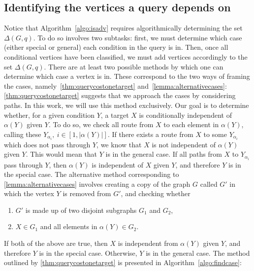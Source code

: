 \subsection{Identifying the vertices a query depends on}
\null \quad \quad Notice that Algorithm~\ref{algo:isadv} requires algorithmically determining the set $\Delta(G,q)$. To do so involves two subtasks: first, we must determine which case (either special or general) each condition in the query is in. Then, once all conditional vertices have been classified, we must add vertices accordingly to the set $\Delta(G,q)$. \newline
\null \quad \quad There are at least two possible methods by which one can determine which case a vertex is in. These correspond to the two ways of framing the cases, namely~\cref{thm:querycostonetarget} and~\cref{lemma:alternativecases}: \newline 
\null \quad \quad \cref{thm:querycostonetarget} suggests that we approach the cases by considering paths. In this work, we will use this method exclusively. Our goal is to determine whether, for a given condition $Y$, a target $X$ is conditionally independent of $\alpha(Y)$ given $Y$. To do so, we check all route from $X$ to each element in $\alpha(Y)$, calling these $Y_{\alpha_{i}},\  i \in [1,|\alpha(Y)|]$. If there exists a route from $X$ to some $Y_{\alpha_{i}}$ which does not pass through $Y$, we know that $X$ is not independent of $\alpha(Y)$ given $Y$. This would mean that $Y$ is in the general case.  If all paths from $X$ to $Y_{\alpha_{i}}$ pass through $Y$, then $\alpha(Y)$ is independent of $X$ given $Y$, and therefore $Y$ is in the special case. \newline
\null \quad \quad The alternative method corresponding to \cref{lemma:alternativecases} involves creating a copy of the graph $G$ called $G'$ in which the vertex $Y$ is removed from $G'$, and checking whether 
\begin{enumerate}
\item $G'$ is made up of two disjoint subgraphs $G_{1}$ and $G_{2}$,
\item $X \in G_{1}$ and all elements in $\alpha(Y) \in G_{2}$. 
\end{enumerate}
If both of the above are true, then $X$ is independent from $\alpha(Y)$ given $Y$, and therefore $Y$ is in the special case. Otherwise, $Y$ is in the general case. \newline
\null \quad \quad The method outlined by \cref{thm:querycostonetarget} is presented in Algorithm~\ref{algo:findcase}:

